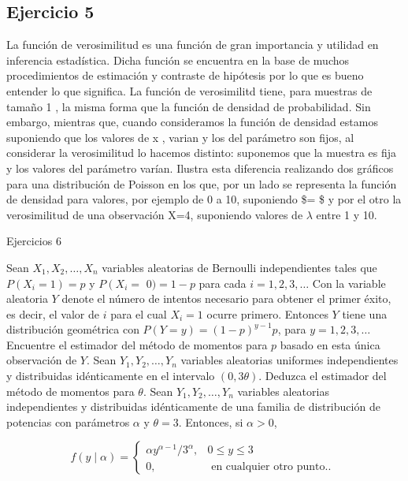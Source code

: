 \documentclass[
]{article}
\begin{document}
\subsection{Ejercicio 5}\label{ejercicio-5-2}

La función de verosimilitud es una función de gran importancia y utilidad en inferencia estadística. Dicha función se encuentra en la base de muchos procedimientos de estimación y contraste de hipótesis por lo que es bueno entender lo que significa. La función de verosimilitd tiene, para muestras de tamaño 1 , la misma forma que la función de densidad de probabilidad. Sin embargo, mientras que, cuando consideramos la función de densidad estamos suponiendo que los valores de x , varian y los del parámetro son fijos, al considerar la verosimilitud lo hacemos distinto: suponemos que la muestra es fija y los valores del parámetro varían. Ilustra esta diferencia realizando dos gráficos para una distribución de Poisson en los que, por un lado se representa la función de densidad para valores, por ejemplo de 0 a 10, suponiendo \$\lambda= \$ y por el otro la verosimilitud de una observación X=4, suponiendo valores de \(\lambda\) entre 1 y 10.

Ejercicios 6

Sean \(X_{1}, X_{2}, \ldots, X_{n}\) variables aleatorias de Bernoulli independientes tales que \(P\left(X_{i}=1\right)=p\) y \(P\left(X_{i}=\right.\) \(0)=1-p\) para cada \(i=1,2,3, \ldots\) Con la variable aleatoria \(Y\) denote el número de intentos necesario para obtener el primer éxito, es decir, el valor de \(i\) para el cual \(X_{i}=1\) ocurre primero. Entonces \(Y\) tiene una distribución geométrica con \(P(Y=y)=(1-p)^{y-1} p\), para \(y=1,2,3, \ldots\) Encuentre el estimador del método de momentos para \(p\) basado en esta única observación de \(Y\).
Sean \(Y_{1}, Y_{2}, \ldots, Y_{n}\) variables aleatorias uniformes independientes y distribuidas idénticamente en el intervalo \((0,3 \theta)\). Deduzca el estimador del método de momentos para \(\theta\).
Sean \(Y_{1}, Y_{2}, \ldots, Y_{n}\) variables aleatorias independientes y distribuidas idénticamente de una familia de distribución de potencias con parámetros \(\alpha\) y \(\theta=3\). Entonces, si \(\alpha>0\),

\[
f(y \mid \alpha)= \begin{cases}\alpha y^{\alpha-1} / 3^{\alpha}, & 0 \leq y \leq 3 \\ 0, & \text { en cualquier otro punto.. }\end{cases}
\]
\end{document}
